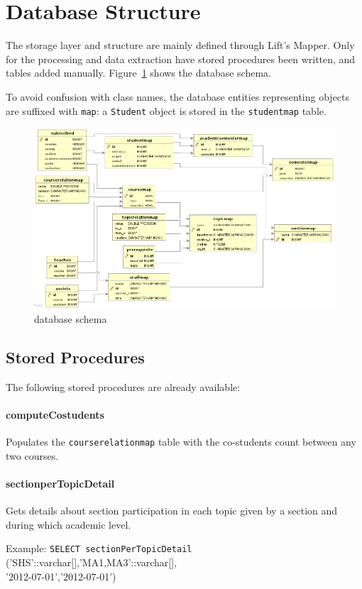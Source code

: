 \section{Database Structure}
The storage layer and structure are mainly defined through Lift's Mapper. Only for the processing and data extraction have stored procedures been written, and tables added manually. Figure~\ref{fig:db_schema} shows the database schema.

To avoid confusion with class names, the database entities representing objects are suffixed with \verb|map|: a \verb|Student| object is stored in the \verb|studentmap| table.

\begin{figure}
\center
\includegraphics[angle=-90, width=.85\columnwidth]{schema_extended.png}
\caption{database schema}
\label{fig:db_schema}
\end{figure}

\subsection{Stored Procedures}
The following stored procedures are already available:
\paragraph{computeCostudents}
Populates the \verb|courserelationmap| table with the co-students count between any two courses.

\paragraph{sectionperTopicDetail} Gets details about section participation in each topic given by a section and during which academic level.

Example: \verb|SELECT sectionPerTopicDetail| ('{SHS}'::varchar[],'{MA1,MA3}'::varchar[],\\'2012-07-01','2012-07-01')

